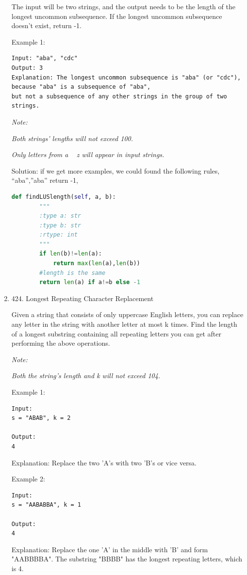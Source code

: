 \documentclass[../specific-algorithms.tex]{subfiles}
\begin{document}
\begin{enumerate}
The input will be two strings, and the output needs to be the length of the longest uncommon subsequence. If the longest uncommon subsequence doesn’t exist, return -1.

Example 1:
\begin{lstlisting}
Input: "aba", "cdc"
Output: 3
Explanation: The longest uncommon subsequence is "aba" (or "cdc"), 
because "aba" is a subsequence of "aba", 
but not a subsequence of any other strings in the group of two strings.
\end{lstlisting}

\textit{Note:}

    \textit{Both strings’ lengths will not exceed 100.}
    
    \textit{Only letters from a ~ z will appear in input strings.}

Solution: if we get more examples, we could found the following rules, “aba”,”aba” return -1,
\begin{lstlisting}[language = Python]
def findLUSlength(self, a, b):
        """
        :type a: str
        :type b: str
        :rtype: int
        """
        if len(b)!=len(a):
            return max(len(a),len(b))
        #length is the same
        return len(a) if a!=b else -1
\end{lstlisting}
\item 424. Longest Repeating Character Replacement

Given a string that consists of only uppercase English letters, you can replace any letter in the string with another letter at most k times. Find the length of a longest substring containing all repeating letters you can get after performing the above operations.

\textit{Note:}

 \textit{Both the string’s length and k will not exceed 104.}

Example 1:
\begin{lstlisting}
Input:
s = "ABAB", k = 2

Output:
4
\end{lstlisting}

Explanation:
Replace the two 'A's with two 'B's or vice versa.

Example 2:
\begin{lstlisting}
Input:
s = "AABABBA", k = 1

Output:
4
\end{lstlisting}

Explanation:
Replace the one 'A' in the middle with 'B' and form "AABBBBA".
The substring "BBBB" has the longest repeating letters, which is 4.


\end{enumerate}
\end{document}
